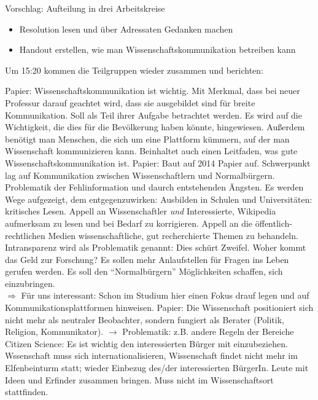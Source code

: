       Vorschlag: Aufteilung in drei Arbeitskreise
      \begin{itemize}
        \item Resolution lesen und über Adressaten Gedanken machen
        \item Handout erstellen, wie man Wissenschaftskommunikation betreiben kann
      \end{itemize}
      Um 15:20 kommen die Teilgruppen wieder zusammen und berichten:
      \begin{outline}
         Papier:
          \2 Wissenschaftskommunikation ist wichtig.
          \2 Mit Merkmal, dass bei neuer Professur darauf geachtet wird, dass sie ausgebildet sind für breite Kommunikation. Soll als Teil ihrer Aufgabe betrachtet werden. Es wird auf die Wichtigkeit, die dies für die Bevölkerung haben könnte, hingewiesen.
          \2 Außerdem benötigt man Menschen, die sich um eine Plattform kümmern, auf der man Wissenschaft kommunizieren kann.
          \2 Beinhaltet auch einen Leitfaden, was gute Wissenschaftskommunikation ist.
         Papier:
          \2 Baut auf 2014 Papier auf.
          \2 Schwerpunkt lag auf Kommunikation zwischen Wissenschaftlern und Normalbürgern.
          \2 Problematik der Fehlinformation und daurch entstehenden Ängsten.
          \2 Es werden Wege aufgezeigt, dem entgegenzuwirken:
            \3 Ausbilden in Schulen und Universitäten: kritisches Lesen.
            \3 Appell an Wissenschaftler \textit{und} Interessierte, Wikipedia aufmerksam zu lesen und bei Bedarf zu korrigieren.
            \3 Appell an die öffentlich-rechtlichen Medien wissenschaftliche, gut recherchierte Themen zu behandeln.
          \2 Intransparenz wird als Problematik genannt: Dies schürt Zweifel. Woher kommt das Geld zur Forschung?
          \2 Es sollen mehr Anlaufstellen für Fragen ins Leben gerufen werden. Es soll den “Normalbürgern” Möglichkeiten schaffen, sich einzubringen. \\
            $\Rightarrow$ Für uns interessant: Schon im Studium hier einen Fokus drauf legen und auf Kommunikationsplattformen hinweisen.
         Papier:
          \2 Die Wissenschaft positioniert sich nicht mehr als neutraler Beobachter, sondern fungiert als Berater (Politik, Religion, Kommunikator). $\rightarrow$ Problematik: z.B. andere Regeln der Bereiche
          \2 Citizen Science: Es ist wichtig den interessierten Bürger mit einzubeziehen.
          \2 Wssenschaft muss sich internationalisieren,
          \2 Wissenschaft findet nicht mehr im Elfenbeinturm statt; wieder Einbezug des/der interessierten BürgerIn. Leute mit Ideen und Erfinder zusammen bringen. Muss nicht im Wissenschaftsort stattfinden.

\end{outline}
